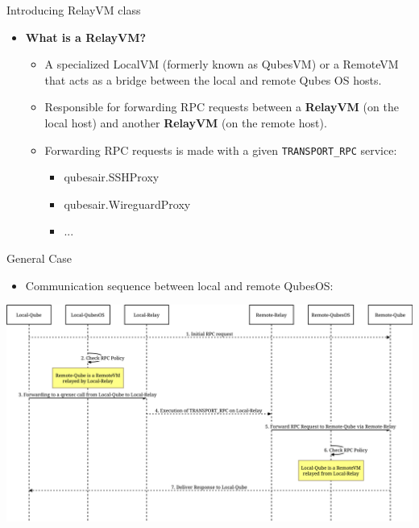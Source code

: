 \documentclass{beamer}
\begin{document}
\begin{frame}{Introducing RelayVM class}
    \begin{itemize}
        \item \textbf{What is a RelayVM?}
        \begin{itemize}
            \item A specialized LocalVM (formerly known as QubesVM) or a RemoteVM that acts as a bridge between the local and remote Qubes OS hosts.
            \item Responsible for forwarding RPC requests between a \textbf{RelayVM} (on the local host) and another \textbf{RelayVM} (on the remote host).
			\item Forwarding RPC requests is made with a given \texttt{TRANSPORT\_RPC} service:
			\begin{itemize}
				\item qubesair.SSHProxy
				\item qubesair.WireguardProxy
				\item ...
			\end{itemize}
        \end{itemize}
    \end{itemize}
\end{frame}

\begin{frame}{General Case}
    \begin{itemize}
        \item Communication sequence between local and remote QubesOS:
    \end{itemize}
    \begin{center}
        \includegraphics[width=\linewidth]{general.png}
    \end{center}
\end{frame}
\end{document}
